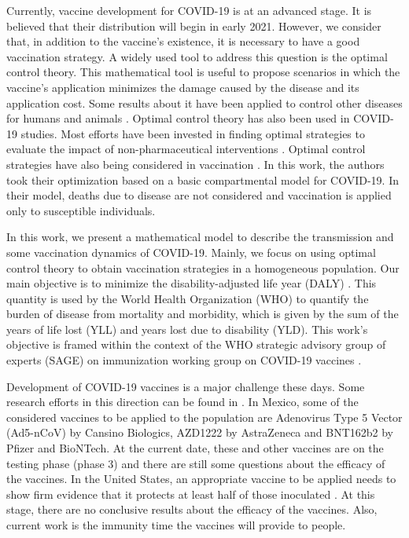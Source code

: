     Currently, vaccine development for COVID-19 is at an advanced stage. It is
believed that their distribution will begin in early 2021. However, we
consider that, in addition to the vaccine's existence, it is necessary to
have a good vaccination strategy. A widely used tool to address this
question is the optimal control theory. This mathematical tool is useful to
propose scenarios in which the vaccine's application minimizes the damage
caused by the disease and its application cost. Some results about it have
been applied to control other diseases for humans and animals
\cite{Asano2008,Rodrigues2014,Tchuenche2011,Malik2016,Jaberi2014}. Optimal
control theory has also been used in COVID-19 studies. Most efforts have
been invested in finding optimal strategies to evaluate the impact of
non-pharmaceutical interventions
\cite{Madubueze2020,Perkins2020,Ullah2020}. Optimal control strategies have
also being considered in vaccination \cite{Barbosa2020}. In this work, the
authors took their optimization based on a basic compartmental model for
COVID-19. In their model, deaths due to disease are not considered and
vaccination is applied only to susceptible individuals.  

In this work, we present a mathematical model to describe the transmission and some vaccination dynamics of COVID-19. Mainly, we focus on using optimal control theory to obtain vaccination strategies in a homogeneous population. Our main objective is to minimize the disability-adjusted life year (DALY) \cite{WhoDALY}. This quantity is used by the World Health Organization (WHO) to quantify the burden of disease from mortality and morbidity, which is given by the sum of the years of life lost (YLL) and years lost due to disability (YLD). This work's objective is framed within the context of the WHO strategic advisory group of experts (SAGE) on immunization working group on COVID-19 vaccines \cite{sage2020}.

Development of COVID-19 vaccines is a major challenge these days. Some research efforts in this direction can be found in \cite{Belete2020,Kaur2020}. In Mexico, some of the considered vaccines to be applied to the population are Adenovirus Type 5 Vector (Ad5-nCoV) by Cansino Biologics, AZD1222 by AstraZeneca and BNT162b2 by Pfizer and BioNTech. At the current date, these and other vaccines are on the testing phase (phase 3) and there are still some questions about the efficacy of the vaccines. In the United States, an appropriate vaccine to be applied needs to show firm evidence that it protects at least half of those inoculated \cite{Shah2020}. At this stage, there are no conclusive results about the efficacy of the vaccines. Also, current work is the immunity time the vaccines will provide to people.

